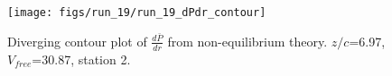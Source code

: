 \begin{figure}[H]
\centering
\texttt{[image: figs/run\_19/run\_19\_dPdr\_contour]}
\caption{Diverging contour plot of $\frac{d\bar{P}}{dr}$ from non-equilibrium theory. $z/c$=6.97, $V_{free}$=30.87, station 2.}
\label{fig:run_19_dPdr_contour}
\end{figure}


